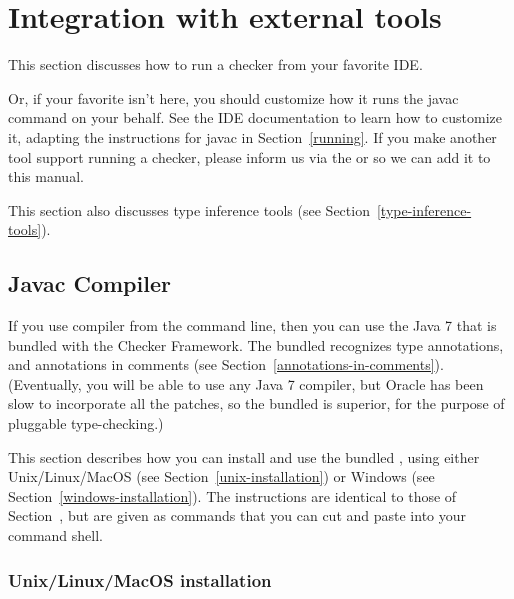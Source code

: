 \htmlhr
\chapter{Integration with external tools\label{external-tools}}

This section discusses how to run a checker from your favorite IDE\@.

Or, if your favorite isn't here, you should customize how it runs the
javac command on your behalf.  See the IDE documentation to learn how to
customize it, adapting the instructions for javac in Section~\ref{running}.
If you make another tool support running a checker, please
inform us via the
 or
 so
we can add it to this manual.

This section also discusses type inference tools (see
Section~\ref{type-inference-tools}).

\section{Javac Compiler\label{javac-installation}}

If you use  compiler from the command line, then you can use the
Java 7  that is bundled with the Checker Framework.  The bundled
 recognizes type annotations, and annotations in
comments (see Section~\ref{annotations-in-comments}).
(Eventually, you will be able to use any Java 7 compiler, but Oracle has
been slow to incorporate all the patches, so the bundled  is
superior, for the purpose of pluggable type-checking.)

This section describes how you can install and use the bundled
, using either Unix/Linux/MacOS (see
Section~\ref{unix-installation}) or Windows (see
Section~\ref{windows-installation}).
The instructions are identical to those of Section~\label{installation},
but are given as commands that you can cut and paste into your command shell.



\subsection{Unix/Linux/MacOS installation\label{unix-installation}}

